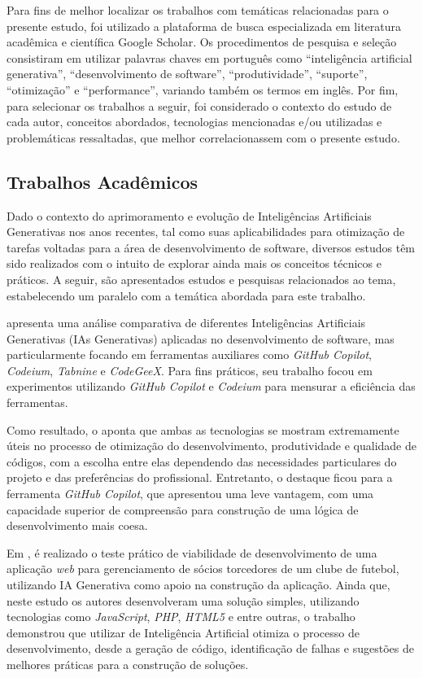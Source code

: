 \documentclass[english,brazilian]{UNISINOSartigo} %
\begin{document}
Para fins de melhor localizar os trabalhos com temáticas relacionadas para o presente estudo, foi utilizado a plataforma de busca especializada em literatura acadêmica e científica Google Scholar. Os procedimentos de pesquisa e seleção consistiram em utilizar palavras chaves em português como “inteligência artificial generativa”, “desenvolvimento de software”, “produtividade”, “suporte”, “otimização” e “performance”, variando também os termos em inglês. Por fim, para selecionar os trabalhos a seguir, foi considerado o contexto do estudo de cada autor, conceitos abordados, tecnologias mencionadas e/ou utilizadas e problemáticas ressaltadas, que melhor correlacionassem com o presente estudo.

\subsection{Trabalhos Acadêmicos}

Dado o contexto do aprimoramento e evolução de Inteligências Artificiais Generativas nos anos recentes, tal como suas aplicabilidades para otimização de tarefas voltadas para a área de desenvolvimento de software, diversos estudos têm sido realizados com o intuito de explorar ainda mais os conceitos técnicos e práticos. A seguir, são apresentados estudos e pesquisas relacionados ao tema, estabelecendo um paralelo com a temática abordada para este trabalho.

 apresenta uma análise comparativa de diferentes Inteligências Artificiais Generativas (IAs Generativas) aplicadas no desenvolvimento de software, mas particularmente focando em ferramentas auxiliares como \textit{GitHub Copilot}, \textit{Codeium}, \textit{Tabnine} e \textit{CodeGeeX}. Para fins práticos, seu trabalho focou em experimentos utilizando \textit{GitHub Copilot} e \textit{Codeium} para mensurar a eficiência das ferramentas.

Como resultado, o  aponta que ambas as tecnologias se mostram extremamente úteis no processo de otimização do desenvolvimento, produtividade e qualidade de códigos, com a escolha entre elas dependendo das necessidades particulares do projeto e das preferências do profissional. Entretanto, o destaque ficou para a ferramenta \textit{GitHub Copilot}, que apresentou uma leve vantagem, com uma capacidade superior de compreensão para construção de uma lógica de desenvolvimento mais coesa.

Em , é realizado o teste prático de viabilidade de desenvolvimento de uma aplicação \textit{web} para gerenciamento de sócios torcedores de um clube de futebol, utilizando IA Generativa como apoio na construção da aplicação. Ainda que, neste estudo os autores desenvolveram uma solução simples, utilizando tecnologias como \textit{JavaScript}, \textit{PHP}, \textit{HTML5} e entre outras, o trabalho demonstrou que utilizar de Inteligência Artificial otimiza o processo de desenvolvimento, desde a geração de código, identificação de falhas e sugestões de melhores práticas para a construção de soluções.
\end{document}
